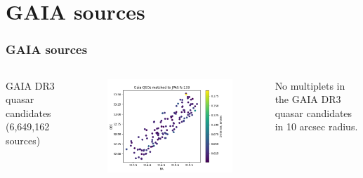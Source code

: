 \documentclass{beamer}
\begin{document}
\section{GAIA sources}

\begin{frame}
    \frametitle{GAIA sources}
    \begin{columns}
            GAIA DR3 quasar candidates (6,649,162 sources)
        \begin{figure}
            \centering
            \includegraphics[width=1.0\textwidth]{../../figs/gaia_qso_jpas.png}
        \end{figure}

        No multiplets in the GAIA DR3 quasar candidates in 10 arcsec radius.


\end{columns}
\end{frame}
\end{document}
